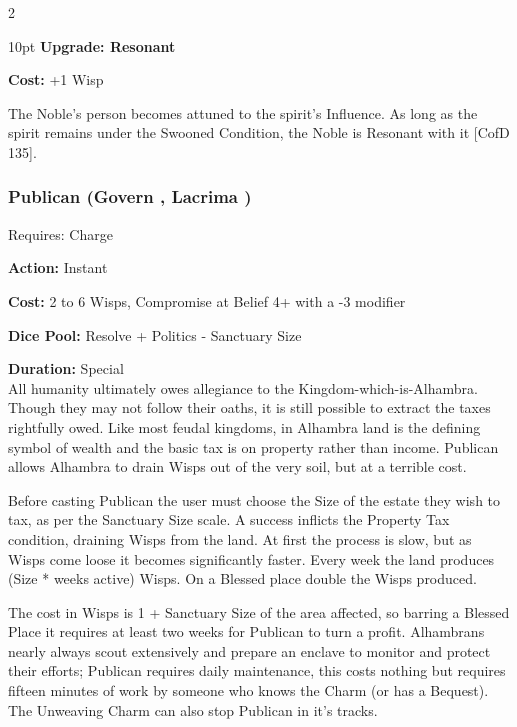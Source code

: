 \begin{multicols}{2}
\begin{myindentpar}{10pt}
\textbf{Upgrade: Resonant}

\textbf{Cost:} +1 Wisp

The Noble’s person becomes attuned to the spirit’s Influence. As long as the spirit remains under the Swooned Condition, the Noble is Resonant with it [CofD 135].

\end{myindentpar}

\subsubsection*{Publican (Govern \textbullet\textbullet\textbullet, Lacrima \textbullet\textbullet)}

\noindent Requires: Charge

\noindent \textbf{Action:} Instant

\noindent \textbf{Cost:} 2 to 6 Wisps, Compromise at Belief 4+ with a -3 modifier

\noindent \textbf{Dice Pool:} Resolve + Politics - Sanctuary Size

\noindent \textbf{Duration:} Special \\

\noindent All humanity ultimately owes allegiance to the Kingdom-which-is-Alhambra. Though they may not follow their oaths, it is still possible to extract the taxes rightfully owed. Like most feudal kingdoms, in Alhambra land is the defining symbol of wealth and the basic tax is on property rather than income. Publican allows Alhambra to drain Wisps out of the very soil, but at a terrible cost. 

Before casting Publican the user must choose the Size of the estate they wish to tax, as per the Sanctuary Size scale. A success inflicts the Property Tax condition, draining Wisps from the land. At first the process is slow, but as Wisps come loose it becomes significantly faster. Every week the land produces (Size * weeks active) Wisps. On a Blessed place double the Wisps produced.

The cost in Wisps is 1 + Sanctuary Size of the area affected, so barring a Blessed Place it requires at least two weeks for Publican to turn a profit. Alhambrans nearly always scout extensively and prepare an enclave to monitor and protect their efforts; Publican requires daily maintenance, this costs nothing but requires fifteen minutes of work by someone who knows the Charm (or has a Bequest). The Unweaving Charm can also stop Publican in it's tracks. 


\end{multicols}
